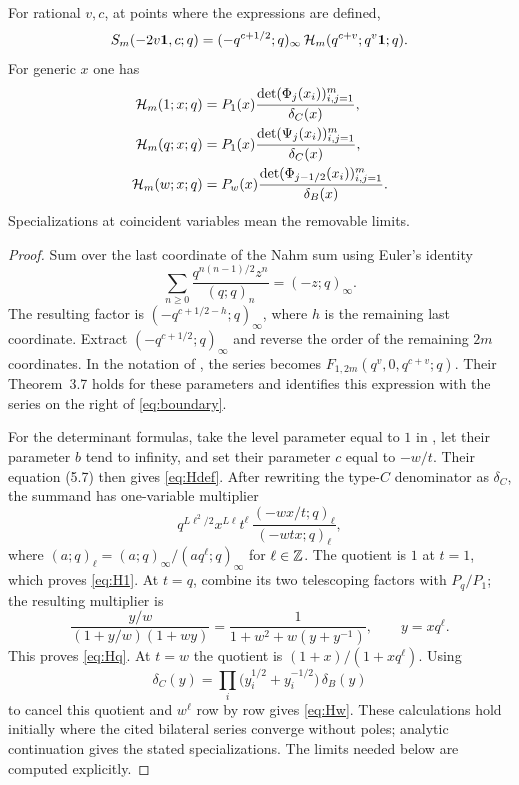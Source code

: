 \begin{lemma}\label{lem:boundary}
For rational $v,c$, at points where the expressions are defined,
\begin{equation}\label{eq:boundary}
S_m(-2v\mathbf{1},c;q)=(-q^{c+1/2};q)_\infty\,\mathcal{H}_m(q^{c+v};q^v\mathbf{1};q).
\end{equation}
For generic $x$ one has
\begin{align}
\mathcal{H}_m(1;x;q)&=P_1(x)\frac{\det(\Phi_j(x_i))_{i,j=1}^m}{\delta_C(x)},\label{eq:H1}\\
\mathcal{H}_m(q;x;q)&=P_1(x)\frac{\det(\Psi_j(x_i))_{i,j=1}^m}{\delta_C(x)},\label{eq:Hq}\\
\mathcal{H}_m(w;x;q)&=P_w(x)\frac{\det(\Phi_{j-1/2}(x_i))_{i,j=1}^m}{\delta_B(x)}.\label{eq:Hw}
\end{align}
Specializations at coincident variables mean the removable limits.
\end{lemma}

\begin{proof}
Sum over the last coordinate of the Nahm sum using Euler's identity
\[
\sum_{n\ge0}\frac{q^{n(n-1)/2}z^n}{(q;q)_n}=(-z;q)_\infty.
\]
The resulting factor is $(-q^{c+1/2-h};q)_\infty$, where $h$ is the remaining last coordinate. Extract $(-q^{c+1/2};q)_\infty$ and reverse the order of the remaining $2m$ coordinates. In the notation of \cite[(3.21)]{BW15}, the series becomes $F_{1,2m}(q^v,0,q^{c+v};q)$. Their Theorem~3.7 holds for these parameters and identifies this expression with the series on the right of \eqref{eq:boundary}.

For the determinant formulas, take the level parameter equal to $1$ in \cite[(5.6a)]{BW15}, let their parameter $b$ tend to infinity, and set their parameter $c$ equal to $-w/t$. Their equation (5.7) then gives \eqref{eq:Hdef}. After rewriting the type-$C$ denominator as $\delta_C$, the summand has one-variable multiplier
\[
q^{L\ell^2/2}x^{L\ell}t^\ell\,\frac{(-wx/t;q)_\ell}{(-wtx;q)_\ell},
\]
where $(a;q)_\ell=(a;q)_\infty/(aq^\ell;q)_\infty$ for $\ell\in\mathbb{Z}$. The quotient is $1$ at $t=1$, which proves \eqref{eq:H1}. At $t=q$, combine its two telescoping factors with $P_q/P_1$; the resulting multiplier is
\[
\frac{y/w}{(1+y/w)(1+wy)}=\frac1{1+w^2+w(y+y^{-1})},\qquad y=xq^\ell.
\]
This proves \eqref{eq:Hq}. At $t=w$ the quotient is $(1+x)/(1+xq^\ell)$. Using
\[
\delta_C(y)=\prod_i\bigl(y_i^{1/2}+y_i^{-1/2}\bigr)\,\delta_B(y)
\]
to cancel this quotient and $w^\ell$ row by row gives \eqref{eq:Hw}. These calculations hold initially where the cited bilateral series converge without poles; analytic continuation gives the stated specializations. The limits needed below are computed explicitly.
\end{proof}

